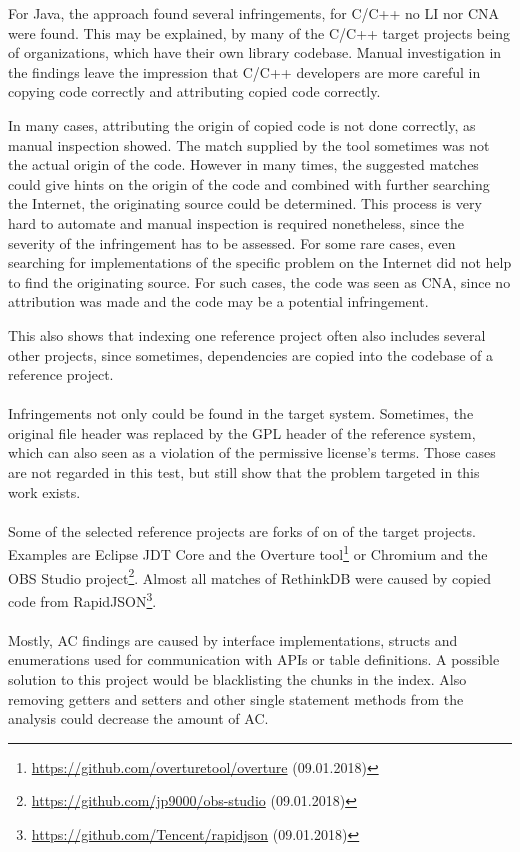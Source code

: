 For Java, the approach found several infringements, for C/C++ no LI nor CNA were found.
This may be explained, by many of the C/C++ target projects being of organizations, which have their own library codebase.
Manual investigation in the findings leave the impression that C/C++ developers are more careful in copying code correctly and attributing copied code correctly.

In many cases, attributing the origin of copied code is not done correctly, as manual inspection showed.
The match supplied by the tool sometimes was not the actual origin of the code.
However in many times, the suggested matches could give hints on the origin of the code and combined with further searching the Internet, the originating source could be determined.
This process is very hard to automate and manual inspection is required nonetheless, since the severity of the infringement has to be assessed.
For some rare cases, even searching for implementations of the specific problem on the Internet did not help to find the originating source.
For such cases, the code was seen as CNA, since no attribution was made and the code may be a potential infringement.

This also shows that indexing one reference project often also includes several other projects, since sometimes, dependencies are copied into the codebase of a reference project.\\
\\
Infringements not only could be found in the target system.
Sometimes, the original file header was replaced by the GPL header of the reference system, which can also seen as a violation of the permissive license's terms.
Those cases are not regarded in this test, but still show that the problem targeted in this work exists.\\
\\
Some of the selected reference projects are forks of on of the target projects.
Examples are Eclipse JDT Core and the Overture tool\footnote{\href{https://github.com/overturetool/overture}{https://github.com/overturetool/overture} (09.01.2018)} or Chromium and the OBS Studio project\footnote{\href{https://github.com/jp9000/obs-studio}{https://github.com/jp9000/obs-studio} (09.01.2018)}.
Almost all matches of RethinkDB were caused by copied code from RapidJSON\footnote{\href{https://github.com/Tencent/rapidjson}{https://github.com/Tencent/rapidjson} (09.01.2018)}.\\
\\
Mostly, AC findings are caused by interface implementations, structs and enumerations used for communication with APIs or table definitions.
A possible solution to this project would be blacklisting the chunks in the index.
Also removing getters and setters and other single statement methods from the analysis could decrease the amount of AC.

